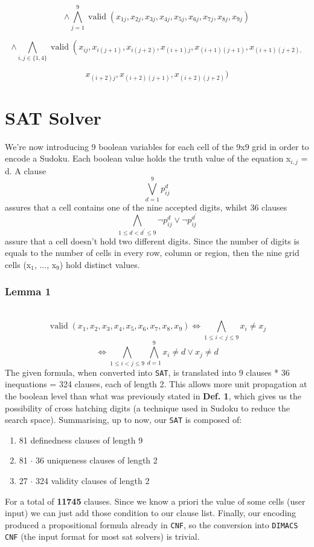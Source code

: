\documentclass[paper=a4, fontsize=14pt]{scrartcl} %
\begin{document}
	\[ \wedge \bigwedge_{j=1}^{9} \operatorname{valid}\left(x_{1 j}, x_{2 j}, x_{3 j}, x_{4 j}, x_{5 j}, x_{6 j}, x_{7 j}, x_{8 j}, x_{9 j}\right)\]
	
	\[ \wedge \bigwedge_{i, j \in\{1,4\}} \operatorname{valid}\left(x_{i j}, x_{i(j+1)}, x_{i(j+2)}, x_{(i+1) j}, x_{(i+1)(j+1)}, x_{(i+1)(j+2),}\right.\]
	
	\[ x_{(i+2) j}, x_{(i+2)(j+1)}, x_{(i+2)(j+2)} )\]
	
	\section*{SAT Solver}
	We're now introducing 9 boolean variables for each cell of the 9x9 grid in order to encode a Sudoku.
	\newline
	Each boolean value holds the truth value of the equation x$_{i,j}$ = d.
	\newline A clause \[\bigvee_{d=1}^{9} p_{i j}^{d}\] assures that a cell contains one of the nine accepted digits, whilst 36 clauses
	\newline
	\[\bigwedge_{1 \leq d<d^{\prime} \leq 9} \neg p_{i j}^{d} \vee \neg p_{i j}^{d^{\prime}} \]
	assure that a cell doesn't hold two different digits.
	\newline
	Since the number of digits is equals to the number of cells in every row, column or region, then the nine grid cells (x$_1$, ..., x$_9$) hold distinct values.
	\newline
	\subsubsection*{Lemma 1} \\
	\[\operatorname{valid}\left(x_{1}, x_{2}, x_{3}, x_{4}, x_{5}, x_{6}, x_{7}, x_{8}, x_{9}\right) \Longleftrightarrow \bigwedge_{1 \leq i<j \leq 9} x_{i} \neq x_{j}\]
	\[\Longleftrightarrow \bigwedge_{1 \leq i<j \leq 9} \bigwedge_{d=1}^{9} x_{i} \neq d \vee x_{j} \neq d\]
	\newline
The given formula, when converted into \texttt{SAT}, is translated into 9 clauses * 36 inequations = 324 clauses, each of length 2. This allows more unit propagation at the boolean level than what was previously stated in \textbf{Def. 1}, which gives us the possibility of cross hatching digits (a technique used in Sudoku to reduce the search space).
\newline
Summarising, up to now, our \texttt{SAT} is composed of:
	\begin{enumerate}
		\item 81 definedness clauses of length 9
		\item 81 $\cdot$ 36 uniqueness clauses of length 2
		\item 27 $\cdot$ 324 validity clauses of length 2
	\end{enumerate}
For a total of \textbf{11745} clauses.
\newline
Since we know a priori the value of some cells (user input) we can just add those condition to our clause list.
\newline
Finally, our encoding produced a propositional formula already in \texttt{CNF}, so the conversion into \texttt{DIMACS CNF} (the input format for most sat solvers) is trivial.
\end{document}
